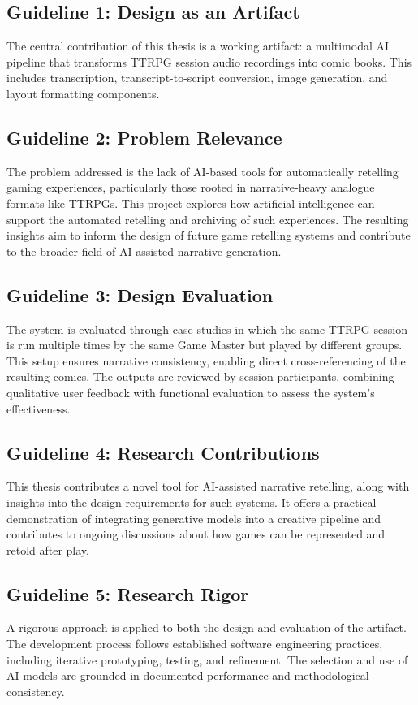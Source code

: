 \subsection*{Guideline 1: Design as an Artifact}
The central contribution of this thesis is a working artifact: a multimodal AI pipeline that transforms TTRPG session audio recordings into comic books. This includes transcription, transcript-to-script conversion, image generation, and layout formatting components.

\subsection*{Guideline 2: Problem Relevance}
The problem addressed is the lack of AI-based tools for automatically retelling gaming experiences, particularly those rooted in narrative-heavy analogue formats like TTRPGs. This project explores how artificial intelligence can support the automated retelling and archiving of such experiences. The resulting insights aim to inform the design of future game retelling systems and contribute to the broader field of AI-assisted narrative generation.

\subsection*{Guideline 3: Design Evaluation}
The system is evaluated through case studies in which the same TTRPG session is run multiple times by the same Game Master but played by different groups. This setup ensures narrative consistency, enabling direct cross-referencing of the resulting comics. The outputs are reviewed by session participants, combining qualitative user feedback with functional evaluation to assess the system's effectiveness.

\subsection*{Guideline 4: Research Contributions}
This thesis contributes a novel tool for AI-assisted narrative retelling, along with insights into the design requirements for such systems. It offers a practical demonstration of integrating generative models into a creative pipeline and contributes to ongoing discussions about how games can be represented and retold after play.

\subsection*{Guideline 5: Research Rigor}
A rigorous approach is applied to both the design and evaluation of the artifact. The development process follows established software engineering practices, including iterative prototyping, testing, and refinement. The selection and use of AI models are grounded in documented performance and methodological consistency.


